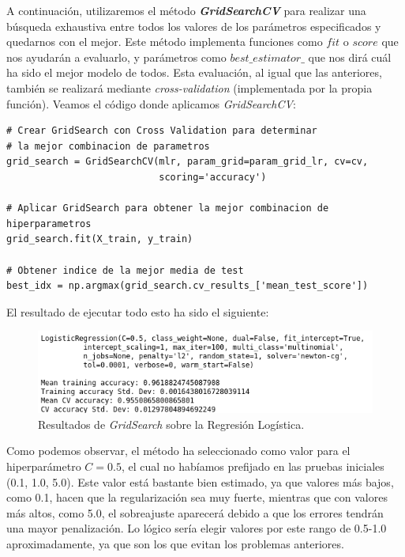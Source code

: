 \documentclass[11pt,a4paper]{article}
\begin{document}
A continuación, utilizaremos el método \textbf{\textit{GridSearchCV}}\cite{GridSearchCV} para realizar una búsqueda exhaustiva entre todos los valores de los parámetros especificados y quedarnos con el mejor. Este método implementa funciones como $fit$ o $score$ que nos ayudarán a evaluarlo, y parámetros como $best\_estimator\_$ que nos dirá cuál ha sido el mejor modelo de todos. Esta evaluación, al igual que las anteriores, también se realizará mediante \textit{cross-validation} (implementada por la propia función). Veamos el código donde aplicamos \textit{GridSearchCV}:

\begin{lstlisting}
# Crear GridSearch con Cross Validation para determinar
# la mejor combinacion de parametros
grid_search = GridSearchCV(mlr, param_grid=param_grid_lr, cv=cv,
                           scoring='accuracy')

# Aplicar GridSearch para obtener la mejor combinacion de hiperparametros
grid_search.fit(X_train, y_train)

# Obtener indice de la mejor media de test
best_idx = np.argmax(grid_search.cv_results_['mean_test_score'])

\end{lstlisting}

El resultado de ejecutar todo esto ha sido el siguiente:

\begin{figure}[H]
    \centering
    \includegraphics[scale=0.6]{img/gs-lr.png}
    \caption{Resultados de \textit{GridSearch} sobre la Regresión Logística.}
    \label{fig:gs-lr}
\end{figure}

Como podemos observar, el método ha seleccionado como valor para el hiperparámetro $C = 0.5$, el cual no habíamos prefijado en las pruebas iniciales (0.1, 1.0, 5.0). Este valor está bastante bien estimado, ya que valores más bajos, como 0.1, hacen que la regularización sea muy fuerte, mientras que con valores más altos, como 5.0, el sobreajuste aparecerá debido a que los errores tendrán una mayor penalización. Lo lógico sería elegir valores por este rango de 0.5-1.0 aproximadamente, ya que son los que evitan los problemas anteriores.
\end{document}
